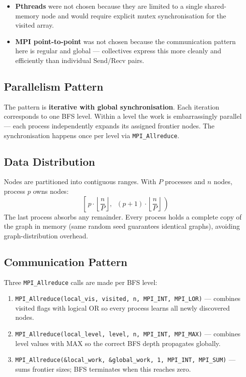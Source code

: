 \documentclass[12pt,a4paper]{article}
\begin{document}
\begin{itemize}[leftmargin=1.5em]
    \item \textbf{Pthreads} were not chosen because they are limited to a single
          shared-memory node and would require explicit mutex synchronisation for
          the visited array.
    \item \textbf{MPI point-to-point} was not chosen because the communication
          pattern here is regular and global --- collectives express this more
          cleanly and efficiently than individual Send/Recv pairs.
\end{itemize}

\subsection{Parallelism Pattern}

The pattern is \textbf{iterative with global synchronisation}. Each iteration
corresponds to one BFS level. Within a level the work is embarrassingly parallel
--- each process independently expands its assigned frontier nodes. The
synchronisation happens once per level via \texttt{MPI\_Allreduce}.

\subsection{Data Distribution}

Nodes are partitioned into contiguous ranges. With $P$ processes and $n$ nodes,
process $p$ owns nodes:
\[
    \left[\, p \cdot \left\lfloor\frac{n}{P}\right\rfloor,\;\;
              (p+1) \cdot \left\lfloor\frac{n}{P}\right\rfloor \,\right)
\]
The last process absorbs any remainder. Every process holds a complete copy of
the graph in memory (same random seed guarantees identical graphs), avoiding
graph-distribution overhead.

\subsection{Communication Pattern}

Three \texttt{MPI\_Allreduce} calls are made per BFS level:

\begin{enumerate}[leftmargin=1.5em]
    \item \texttt{MPI\_Allreduce(local\_vis, visited, n, MPI\_INT, MPI\_LOR)}
          --- combines visited flags with logical OR so every process learns all
          newly discovered nodes.
    \item \texttt{MPI\_Allreduce(local\_level, level, n, MPI\_INT, MPI\_MAX)}
          --- combines level values with MAX so the correct BFS depth propagates
          globally.
    \item \texttt{MPI\_Allreduce(\&local\_work, \&global\_work, 1, MPI\_INT, MPI\_SUM)}
          --- sums frontier sizes; BFS terminates when this reaches zero.
\end{enumerate}
\end{document}
